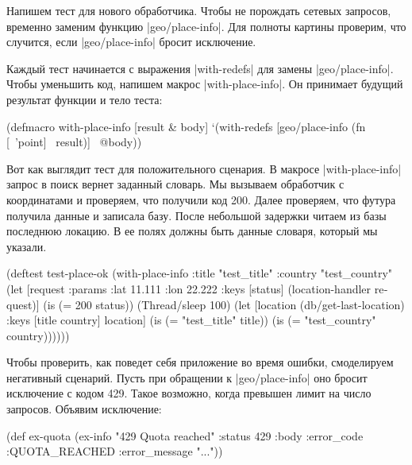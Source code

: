 Напишем тест для нового обработчика. Чтобы не порождать сетевых запросов,
временно заменим функцию \spverb|geo/place-info|. Для полноты картины проверим,
что случится, если \spverb|geo/place-info| бросит исключение.

Каждый тест начинается с выражения \spverb|with-redefs| для замены
\spverb|geo/place-info|. Чтобы уменьшить код, напишем макрос
\spverb|with-place-info|. Он принимает будущий результат функции и тело теста:

\begin{english}
  \begin{clojure}
(defmacro with-place-info
  [result & body]
  `(with-redefs [geo/place-info
                 (fn [~'point] ~result)]
     ~@body))
  \end{clojure}
\end{english}

Вот как выглядит тест для положительного сценария. В макросе
\spverb|with-place-info| запрос в поиск вернет заданный словарь. Мы вызываем
обработчик с координатами и проверяем, что получили код 200. Далее проверяем,
что футура получила данные и записала базу. После небольшой задержки читаем из
базы последнюю локацию. В ее полях должны быть данные словаря, который мы
указали.

\begin{english}
  \begin{clojure}
(deftest test-place-ok
  (with-place-info
    {:title "test_title"
     :country "test_country"}
    (let [request {:params {:lat 11.111 :lon 22.222}}
          {:keys [status]} (location-handler request)]
      (is (= 200 status))
      (Thread/sleep 100)
      (let [location (db/get-last-location)
            {:keys [title country]} location]
        (is (= "test_title" title))
        (is (= "test_country" country))))))
  \end{clojure}
\end{english}

Чтобы проверить, как поведет себя приложение во время ошибки, смоделируем
негативный сценарий. Пусть при обращении к \spverb|geo/place-info| оно бросит
исключение с кодом 429. Такое возможно, когда превышен лимит на число
запросов. Объявим исключение:

\begin{english}
  \begin{clojure}
(def ex-quota
  (ex-info "429 Quota reached"
           {:status 429
            :body {:error_code :QUOTA_REACHED
                   :error_message "..."}}))
  \end{clojure}
\end{english}

